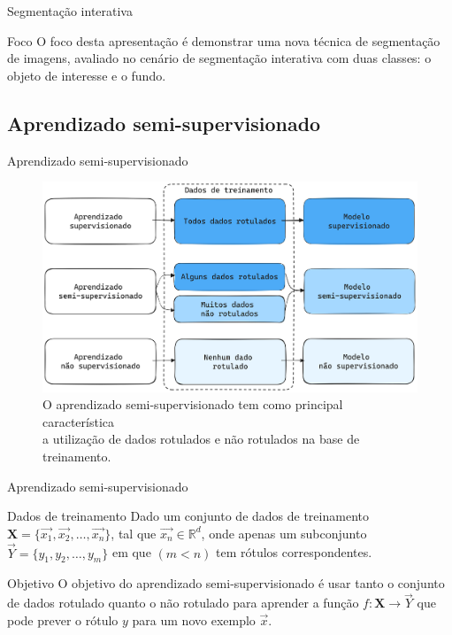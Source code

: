\documentclass{templatebeamerufc/libs/ufc_format}
\begin{document}
\begin{frame}{Segmentação interativa}
  \begin{alertblock}{Foco}
  O foco desta apresentação é demonstrar uma nova técnica de
  segmentação de imagens, avaliado no cenário de segmentação
  interativa com duas classes: o objeto de interesse e o fundo.
  \end{alertblock}
\end{frame}


\subsection{Aprendizado semi-supervisionado}

\begin{frame}{Aprendizado semi-supervisionado}
  \begin{figure}\label{fig:interactive--segmentation}
    \centering
    \caption{
      O aprendizado semi-supervisionado tem como principal
característica \\ a utilização de dados rotulados e não rotulados na base
de treinamento.
}
    \includegraphics[scale=0.1]{figuras/ilustracao-aprendizado-semi-supervisionado}
    \source{\fonteautor}
  \end{figure}
\end{frame}


\begin{frame}{Aprendizado semi-supervisionado}
  \begin{block}{Dados de treinamento}
    Dado um conjunto de dados de treinamento $ \mathbf{X} =
    \{\vec{x_1}, \vec{x_2}, \ldots, \vec{x_n}\} $, tal que $ \vec{x_n} \in \mathbb{R}^d $,
    onde apenas um subconjunto $ \vec{Y} = \{y_1, y_2, \ldots , y_m\} $ em que
    $ (m < n) $ tem rótulos correspondentes.
  \end{block}

  \pause{}

  \begin{block}{Objetivo}
    O objetivo do aprendizado semi-supervisionado é usar tanto o
conjunto de dados rotulado quanto o não rotulado para aprender a
função $ f: \mathbf{X} \rightarrow \vec{Y} $ que pode prever o rótulo $ y $ para
um novo exemplo $ \vec{x} $.
  \end{block}
\end{frame}
\end{document}
